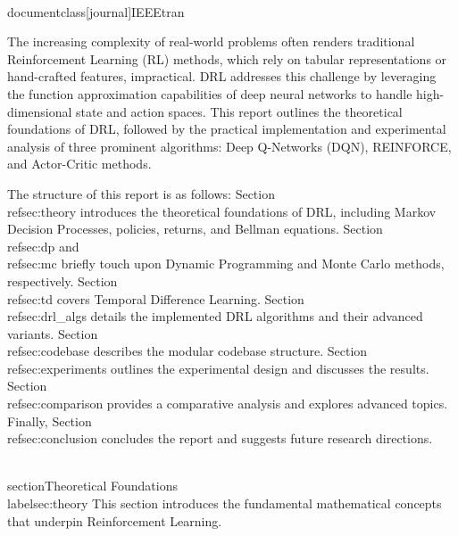 \\documentclass[journal]{IEEEtran}
\begin{document}
The increasing complexity of real-world problems often renders traditional Reinforcement Learning (RL) methods, which rely on tabular representations or hand-crafted features, impractical. DRL addresses this challenge by leveraging the function approximation capabilities of deep neural networks to handle high-dimensional state and action spaces. This report outlines the theoretical foundations of DRL, followed by the practical implementation and experimental analysis of three prominent algorithms: Deep Q-Networks (DQN), REINFORCE, and Actor-Critic methods.

The structure of this report is as follows: Section \\ref{sec:theory} introduces the theoretical foundations of DRL, including Markov Decision Processes, policies, returns, and Bellman equations. Section \\ref{sec:dp} and \\ref{sec:mc} briefly touch upon Dynamic Programming and Monte Carlo methods, respectively. Section \\ref{sec:td} covers Temporal Difference Learning. Section \\ref{sec:drl_algs} details the implemented DRL algorithms and their advanced variants. Section \\ref{sec:codebase} describes the modular codebase structure. Section \\ref{sec:experiments} outlines the experimental design and discusses the results. Section \\ref{sec:comparison} provides a comparative analysis and explores advanced topics. Finally, Section \\ref{sec:conclusion} concludes the report and suggests future research directions.

\\section{Theoretical Foundations}
\\label{sec:theory}
This section introduces the fundamental mathematical concepts that underpin Reinforcement Learning.
\end{document}
